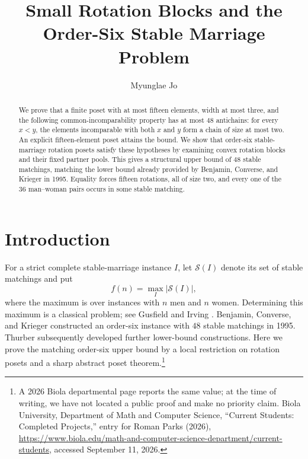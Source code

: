 \documentclass[11pt]{article}
\title{Small Rotation Blocks and the Order-Six Stable Marriage Problem}
\author{Myunglae Jo}
\date{}
\numberwithin{equation}{section}
\theoremstyle{definition}
\theoremstyle{remark}
\newcommand{\SM}{\mathcal S}
\begin{document}
\maketitle

\begin{abstract}
We prove that a finite poset with at most fifteen elements, width at most
three, and the following common-incomparability property has at most $48$
antichains: for every $x<y$, the elements incomparable with both $x$ and $y$
form a chain of size at most two.  An explicit fifteen-element poset attains
the bound.  We show that order-six stable-marriage rotation posets satisfy
these hypotheses by examining convex rotation blocks and their fixed partner
pools.  This gives a structural upper bound of $48$ stable matchings, matching
the lower bound already provided by Benjamin, Converse, and Krieger in 1995.
Equality forces fifteen rotations, all of size two, and every one of the $36$
man--woman pairs occurs in some stable matching.
\end{abstract}

\section{Introduction}

For a strict complete stable-marriage instance $I$, let $\SM(I)$ denote its
set of stable matchings and put
\[
        f(n)=\max_I |\SM(I)|,
\]
where the maximum is over instances with $n$ men and $n$ women.  Determining
this maximum is a classical problem; see Gusfield and Irving
\cite{GusfieldIrving1989}.  Benjamin, Converse, and Krieger
\cite{BenjaminCK1995} constructed an order-six instance with $48$ stable
matchings in 1995.  Thurber \cite{Thurber2002} subsequently developed further
lower-bound constructions.  Here we prove the matching order-six upper bound
by a local restriction on rotation posets and a sharp abstract poset
theorem.\footnote{A 2026 Biola departmental page reports the same value; at
the time of writing, we have not located a public proof and make no priority
claim.  Biola University, Department of Math and Computer Science,
``Current Students: Completed Projects,'' entry for Roman Parks (2026),
\url{https://www.biola.edu/math-and-computer-science-department/current-students},
accessed September 11, 2026.}
\end{document}

